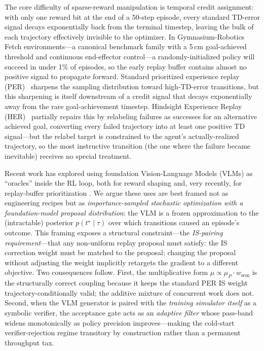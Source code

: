 \documentclass{article}
\begin{document}
The core difficulty of sparse-reward manipulation is temporal credit assignment:
with only one reward bit at the end of a 50-step episode, every standard
TD-error signal decays exponentially back from the terminal timestep, leaving
the bulk of each trajectory effectively invisible to the optimizer. In
Gymnasium-Robotics Fetch environments---a canonical benchmark family with a
5\,cm goal-achieved threshold and continuous end-effector control---a
randomly-initialized policy will succeed in under 1\% of episodes, so the
early replay buffer contains almost no positive signal to propagate forward.
Standard prioritized experience replay (PER)~\citep{schaul2016per} sharpens
the sampling distribution toward high-TD-error transitions, but this sharpening
is itself downstream of a credit signal that decays exponentially away from
the rare goal-achievement timestep. Hindsight Experience Replay
(HER)~\citep{andrychowicz2017her} partially repairs this by relabeling failures
as successes for an alternative achieved goal, converting every failed trajectory
into at least one positive TD signal---but the relabel target is constrained to
the agent's actually-realized trajectory, so the most instructive transition
(the one where the failure became inevitable) receives no special treatment.

Recent work has explored using foundation Vision-Language Models (VLMs) as
``oracles'' inside the RL loop, both for reward shaping \citep{rocamonde2024vlmreward,lee2025kagi,venuto2024car}
and, very recently, for replay-buffer prioritization \citep{sharony2026vlmrb}. We
argue these uses are best framed not as engineering recipes but as
\emph{importance-sampled stochastic optimization with a foundation-model proposal
distribution}: the VLM is a frozen approximation to the (intractable) posterior
$p(t^\star\mid\tau)$ over which transitions caused an episode's outcome. This
framing exposes a structural constraint---the \emph{IS-pairing requirement}---that
any non-uniform replay proposal must satisfy: the IS correction weight must be
matched to the proposal; changing the proposal without adjusting the weight
implicitly retargets the gradient to a different objective. Two consequences
follow. First, the multiplicative form $\mu\!\propto\!\mu_P\!\cdot\!w_{\text{sem}}$
is the structurally correct coupling because it keeps the standard PER IS weight
trajectory-conditionally valid; the additive mixture of concurrent work
\citep{sharony2026vlmrb} does not. Second, when the VLM generator is paired with
the \emph{training simulator itself} as a symbolic verifier, the acceptance gate
acts as an \emph{adaptive filter} whose pass-band widens monotonically as policy
precision improves---making the cold-start verifier-rejection regime transitory
by construction rather than a permanent throughput tax.
\end{document}
